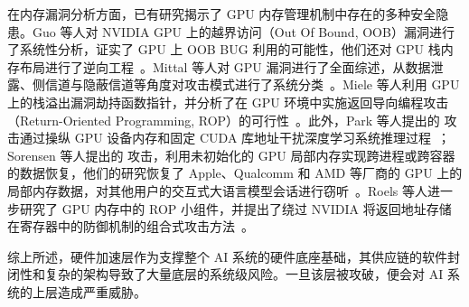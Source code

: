在内存漏洞分析方面，已有研究揭示了 GPU 内存管理机制中存在的多种安全隐患。Guo 等人对 NVIDIA GPU 上的越界访问（Out Of Bound, OOB）漏洞进行了系统性分析，证实了 GPU 上 OOB BUG 利用的可能性，他们还对 GPU 栈内存布局进行了逆向工程~\cite{yanan:profit_for_fun}。Mittal 等人对 GPU 漏洞进行了全面综述，从数据泄露、侧信道与隐蔽信道等角度对攻击模式进行了系统分类~\cite{mittal2018survey}。Miele 等人利用 GPU 上的栈溢出漏洞劫持函数指针，并分析了在 GPU 环境中实施返回导向编程攻击（Return-Oriented Programming, ROP）的可行性~\cite{miele2016buffer}。此外，Park 等人提出的  攻击通过操纵 GPU 设备内存和固定 CUDA 库地址干扰深度学习系统推理过程~\cite{park2020mind}；Sorensen 等人提出的  攻击，利用未初始化的 GPU 局部内存实现跨进程或跨容器的数据恢复，他们的研究恢复了 Apple、Qualcomm 和 AMD 等厂商的 GPU 上的局部内存数据，对其他用户的交互式大语言模型会话进行窃听~\cite{tyler2024leftoverlocals}。Roels 等人进一步研究了 GPU 内存中的 ROP 小组件，并提出了绕过 NVIDIA 将返回地址存储在寄存器中的防御机制的组合式攻击方法~\cite{returning_exploits2025}。

综上所述，硬件加速层作为支撑整个 AI 系统的硬件底座基础，其供应链的软件封闭性和复杂的架构导致了大量底层的系统级风险。一旦该层被攻破，便会对 AI 系统的上层造成严重威胁。
